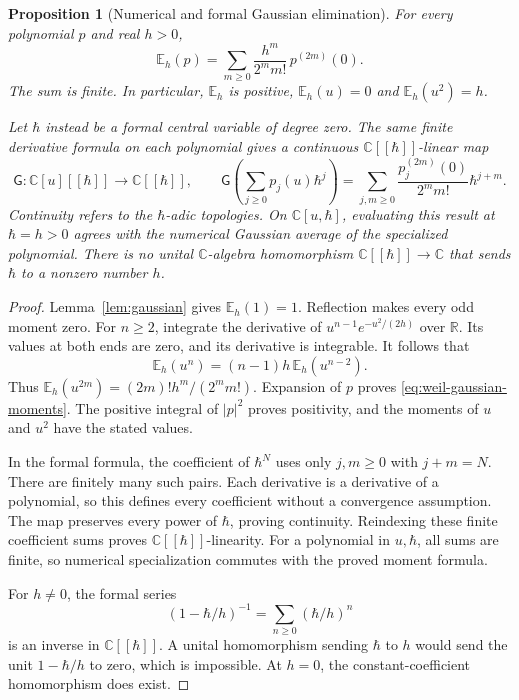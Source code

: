 \documentclass[11pt]{article}
\newtheorem{proposition}[theorem]{Proposition}
\theoremstyle{definition}
\theoremstyle{remark}
\numberwithin{equation}{section}
\newcommand{\R}{\mathbb R}
\newcommand{\C}{\mathbb C}
\begin{document}
\begin{proposition}[Numerical and formal Gaussian elimination]
\label{prop:weil-gaussian-comparison}
For every polynomial $p$ and real $h>0$,
\begin{equation}
 \mathbb E_h(p)
 =\sum_{m\geq0}\frac{h^m}{2^m m!}\,p^{(2m)}(0).
 \label{eq:weil-gaussian-moments}
\end{equation}
The sum is finite.  In particular, $\mathbb E_h$ is positive,
$\mathbb E_h(u)=0$ and $\mathbb E_h(u^2)=h$.

Let $\hbar$ instead be a formal central variable of degree zero.
The same finite derivative formula on each polynomial gives a continuous
$\C[[\hbar]]$-linear map
\[
 \mathsf G:\C[u][[\hbar]]\longrightarrow\C[[\hbar]],\qquad
 \mathsf G\!\left(\sum_{j\geq0}p_j(u)\hbar^j\right)
  =\sum_{j,m\geq0}\frac{p_j^{(2m)}(0)}{2^m m!}\hbar^{j+m}.
\]
Continuity refers to the $\hbar$-adic topologies.
On $\C[u,\hbar]$, evaluating this result at $\hbar=h>0$ agrees
with the numerical Gaussian average of the specialized polynomial.
There is no unital $\C$-algebra homomorphism
$\C[[\hbar]]\to\C$ that sends $\hbar$ to a nonzero number $h$.
\end{proposition}
\begin{proof}
Lemma~\ref{lem:gaussian} gives $\mathbb E_h(1)=1$.
Reflection makes every odd moment zero.
For $n\geq2$, integrate the derivative of
$u^{n-1}e^{-u^2/(2h)}$ over $\R$.
Its values at both ends are zero, and its derivative is integrable.
It follows that
\[
 \mathbb E_h(u^n)=(n-1)h\,\mathbb E_h(u^{n-2}).
\]
Thus
$\mathbb E_h(u^{2m})=(2m)!h^m/(2^m m!)$.
Expansion of $p$ proves \eqref{eq:weil-gaussian-moments}.
The positive integral of $|p|^2$ proves positivity, and the moments
of $u$ and $u^2$ have the stated values.

In the formal formula, the coefficient of $\hbar^N$ uses only
$j,m\geq0$ with $j+m=N$.  There are finitely many such pairs.
Each derivative is a derivative of a polynomial, so this defines every
coefficient without a convergence assumption.
The map preserves every power of $\hbar$, proving continuity.
Reindexing these finite coefficient sums proves
$\C[[\hbar]]$-linearity.  For a polynomial in $u,\hbar$, all sums are
finite, so numerical specialization commutes with the proved moment formula.

For $h\ne0$, the formal series
\[
 (1-\hbar/h)^{-1}=\sum_{n\geq0}(\hbar/h)^n
\]
is an inverse in $\C[[\hbar]]$.
A unital homomorphism sending $\hbar$ to $h$ would send the unit
$1-\hbar/h$ to zero, which is impossible.
At $h=0$, the constant-coefficient homomorphism does exist.
\end{proof}
\end{document}
